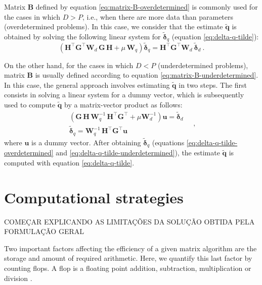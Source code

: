 Matrix $\mathbf{B}$ defined by equation \ref{eq:matrix-B-overdetermined} is commonly used for the cases in which $D > P$, i.e., when
there are more data than parameters (overdetermined problems).
In this case, we consider that the estimate $\tilde{\mathbf{q}}$ is obtained by solving the following linear system
for $\tilde{\boldsymbol{\delta}}_{q}$ (equation \ref{eq:delta-q-tilde}):
\begin{equation}
	\left( \mathbf{H}^{\top} \mathbf{G}^{\top} \mathbf{W}_{d} \, \mathbf{G} \, \mathbf{H} + 
	\mu \, \mathbf{W}_{q} \right) 
	\tilde{\boldsymbol{\delta}}_{q} = 
	\mathbf{H}^{\top} \mathbf{G}^{\top} \mathbf{W}_{d} \: 
	\tilde{\boldsymbol{\delta}}_{d} \: .
	\label{eq:delta-q-tilde-overdetermined}
\end{equation}

On the other hand, for the cases in which $D < P$ (underdetermined problems), matrix $\mathbf{B}$ is 
usually defined according to equation \ref{eq:matrix-B-underdetermined}. In this case, the general approach involves 
estimating $\tilde{\mathbf{q}}$ in two steps. The first consists in solving a linear system 
for a dummy vector, which is subsequently used to compute $\tilde{\mathbf{q}}$ by a matrix-vector product as follows:
\begin{equation}
	\begin{split}
		\left( \mathbf{G} \, \mathbf{H} \, \mathbf{W}_{q}^{-1} \,
		\mathbf{H}^{\top}\mathbf{G}^{\top} + \mu \mathbf{W}_{d}^{-1} \right)  
		\mathbf{u} = \tilde{\boldsymbol{\delta}}_{d} \\
		\tilde{\boldsymbol{\delta}}_{q} = \mathbf{W}_{q}^{-1} \, \mathbf{H}^{\top} \mathbf{G}^{\top} \mathbf{u}
	\end{split} \quad ,
	\label{eq:delta-q-tilde-underdetermined}
\end{equation}
where $\mathbf{u}$ is a dummy vector.
After obtaining $\tilde{\boldsymbol{\delta}}_{q}$ (equations \ref{eq:delta-q-tilde-overdetermined} and \ref{eq:delta-q-tilde-underdetermined}),
the estimate $\tilde{\mathbf{q}}$ is computed with equation \ref{eq:delta-q-tilde}.

\section{Computational strategies}

COMEÇAR EXPLICANDO AS LIMITAÇÕES DA SOLUÇÃO OBTIDA PELA FORMULAÇÃO GERAL

Two important factors affecting the efficiency of a given matrix algorithm are the 
storage and amount of required arithmetic. Here, we quantify this last factor by counting flops.
A flop is a floating point addition, subtraction, multiplication or division \cite[][ p. 12--14]{golub-vanloan2013}.


